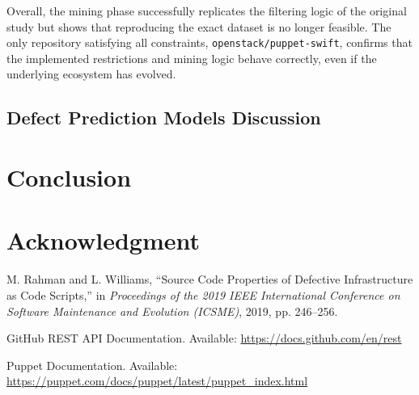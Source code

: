 \documentclass[conference]{IEEEtran}
\begin{document}
Overall, the mining phase successfully replicates the filtering logic of the original study but shows that reproducing the exact dataset is no longer feasible. The only repository satisfying all constraints, \texttt{openstack/puppet-swift}, confirms that the implemented restrictions and mining logic behave correctly, even if the underlying ecosystem has evolved.

\subsection{Defect Prediction Models Discussion}

	
	\section{Conclusion}
	
	\section*{Acknowledgment}
	
	\begin{thebibliography}{00}
		
		M. Rahman and L. Williams, ``Source Code Properties of Defective Infrastructure as Code Scripts,'' 
		in \textit{Proceedings of the 2019 IEEE International Conference on Software Maintenance and Evolution (ICSME)}, 
		2019, pp. 246--256.
		
		GitHub REST API Documentation. Available: \url{https://docs.github.com/en/rest}
		
		Puppet Documentation. Available: \url{https://puppet.com/docs/puppet/latest/puppet\_index.html}
		
	\end{thebibliography}
	
\end{document}
